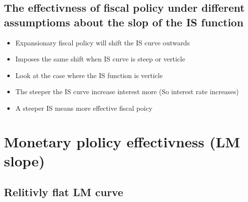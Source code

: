 \documentclass[twocolumn]{article}
\providecommand{\tightlist}{%
  \setlength{\itemsep}{0pt}\setlength{\parskip}{0pt}}
\begin{document}
\hypertarget{the-effectivness-of-fiscal-policy-under-different-assumptioms-about-the-slop-of-the-is-function}{%
\subsection{The effectivness of fiscal policy under different
assumptioms about the slop of the IS
function}\label{the-effectivness-of-fiscal-policy-under-different-assumptioms-about-the-slop-of-the-is-function}}

\begin{itemize}
\tightlist
\item
  Expansionary fiscal policy will shift the IS curve outwards
\item
  Imposes the same shift when IS curve is steep or verticle
\item
  Look at the case where the IS function is verticle
\item
  The steeper the IS curve increase interest more (So interest rate
  increases)
\item
  A steeper IS means more effective fiscal poicy
\end{itemize}

\hypertarget{monetary-plolicy-effectivness-lm-slope}{%
\section{Monetary plolicy effectivness (LM
slope)}\label{monetary-plolicy-effectivness-lm-slope}}

\hypertarget{relitivly-flat-lm-curve}{%
\subsection{Relitivly flat LM curve}\label{relitivly-flat-lm-curve}}
\end{document}
